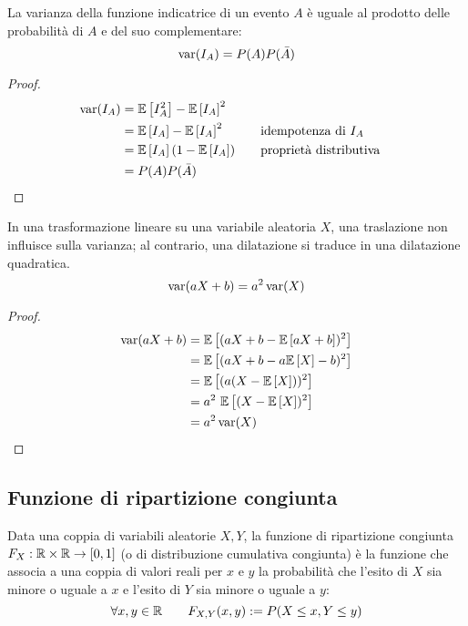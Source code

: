 \begin{prop} \label{prop:indvar}
	La varianza della funzione indicatrice di un evento $A$ è uguale al prodotto delle probabilità di $A$ e del suo complementare:
	\begin{equation*}
		\operatorname{var}(I_A) = P(A)P(\bar A)
	\end{equation*}
\end{prop}
\begin{proof}
	\begin{align*}
		\operatorname{var}(I_A) & = \mathbb{E}\left[ I_A^2 \right]- \mathbb{E}\left[ I_A \right]^2                             \\
		          & = \mathbb{E}\left[ I_A \right]- \mathbb{E}\left[ I_A \right]^2   & \quad & \text{idempotenza di $I_A$}   \\
		          & = \mathbb{E}\left[ I_A \right](1- \mathbb{E}\left[ I_A \right])  & \quad & \text{proprietà distributiva} \\
		          & = P(A)P(\bar A)
	\end{align*}
\end{proof}

\begin{prop}
	In una trasformazione lineare su una variabile aleatoria $X$, una traslazione non influisce sulla varianza; al contrario, una dilatazione si traduce in una dilatazione quadratica.
	\begin{equation*}
		\operatorname{var}(aX+b)=a^2\operatorname{var}(X)
	\end{equation*}
\end{prop}
\begin{proof}
	\begin{align*}
		\operatorname{var}(aX+b) & = \mathbb{E}\left[ (aX+b-\mathbb{E}\left[ aX+b \right])^2 \right] \\
		           & = \mathbb{E}\left[ (aX+b-a\mathbb{E}\left[ X \right]-b)^2 \right] \\
		           & = \mathbb{E}\left[ (a(X-\mathbb{E}\left[ X \right]))^2 \right]    \\
		           & = a^2~\mathbb{E}\left[ (X-\mathbb{E}\left[ X \right])^2 \right]   \\
		           & = a^2 \operatorname{var}(X)             \\
	\end{align*}
\end{proof}



\subsection{Funzione di ripartizione congiunta}
\begin{defin}
	Data una coppia di variabili aleatorie $X, Y$, la funzione di ripartizione congiunta $F_X:\mathbb R\times\mathbb R\to[0,1]$ (o di distribuzione cumulativa congiunta) è la funzione che associa a una coppia di valori reali per $x$ e $y$ la probabilità che l'esito di $X$ sia minore o uguale a $x$ e l'esito di $Y$ sia minore o uguale a $y$:
	\begin{equation*}
		\forall x,y\in\mathbb R\qquad F_{X,Y}(x,y):=P(X\leq x, Y\leq y) \\
	\end{equation*}
\end{defin}

